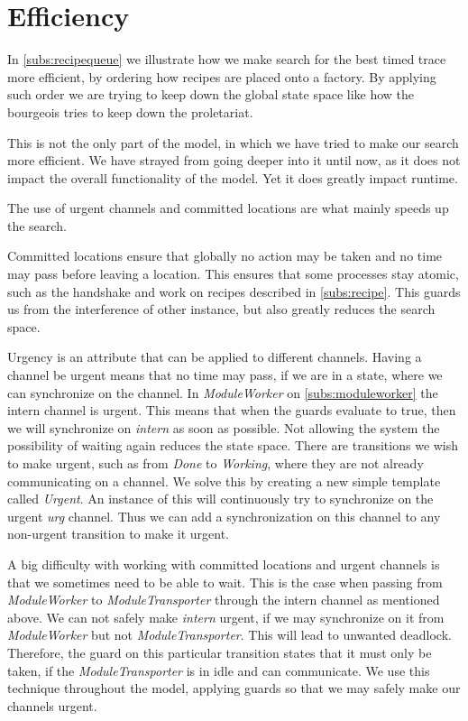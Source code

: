 \section{Efficiency}\label{subs:efficiency}
In \cref{subs:recipequeue} we illustrate how we make search for the best timed trace more efficient, by ordering how recipes are placed onto a factory. By applying such order we are trying to keep down the global state space like how the bourgeois tries to keep down the proletariat.   

This is not the only part of the model, in which we have tried to make our search more efficient. We have strayed from going deeper into it until now, as it does not impact the overall functionality of the model. Yet it does greatly impact runtime. 

The use of urgent channels and committed locations are what mainly speeds up the search.

Committed locations ensure that globally no action may be taken and no time may pass before leaving a location. This ensures that some processes stay atomic, such as the handshake and work on recipes described in \cref{subs:recipe}. This guards us from the interference of other instance, but also greatly reduces the search space.

Urgency is an attribute that can be applied to different channels. Having a channel be urgent means that no time may pass, if we are in a state, where we can synchronize on the channel. In \emph{ModuleWorker} on \cref{subs:moduleworker} the intern channel is urgent. This means that when the guards evaluate to true, then we will synchronize on \emph{intern} as soon as possible. Not allowing the system the possibility of waiting again reduces the state space. There are transitions we wish to make urgent, such as from \emph{Done} to \emph{Working}, where they are not already communicating on a channel. We solve this by creating a new simple template called \emph{Urgent}. An instance of this will continuously try to synchronize on the urgent \emph{urg} channel. Thus we can add a synchronization on this channel to any non-urgent transition to make it urgent. 

A big difficulty with working with committed locations and urgent channels is that we sometimes need to be able to wait. This is the case when passing from \emph{ModuleWorker} to \emph{ModuleTransporter} through the intern channel as mentioned above. We can not safely make \emph{intern} urgent, if we may synchronize on it from \emph{ModuleWorker} but not   \emph{ModuleTransporter}. This will lead to unwanted deadlock.  Therefore, the guard on this particular transition states that it must only be taken, if the \emph{ModuleTransporter} is in idle and can communicate. We use this technique throughout the model, applying guards so that we may safely make our channels urgent. 

